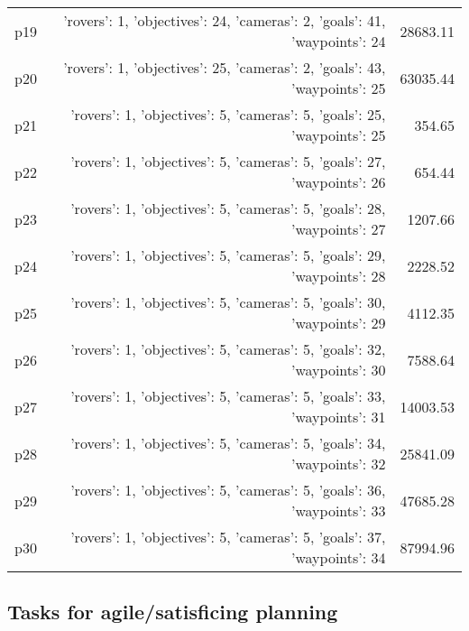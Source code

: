 \documentclass{article}
\begin{document}
\begin{center}
\begin{tabular}{@{}l|r|r@{}}
  p19&{'rovers': 1, 'objectives': 24, 'cameras': 2, 'goals': 41, 'waypoints': 24}&28683.11\\
  p20&{'rovers': 1, 'objectives': 25, 'cameras': 2, 'goals': 43, 'waypoints': 25}&63035.44\\
  p21&{'rovers': 1, 'objectives': 5, 'cameras': 5, 'goals': 25, 'waypoints': 25}&354.65\\
  p22&{'rovers': 1, 'objectives': 5, 'cameras': 5, 'goals': 27, 'waypoints': 26}&654.44\\
  p23&{'rovers': 1, 'objectives': 5, 'cameras': 5, 'goals': 28, 'waypoints': 27}&1207.66\\
  p24&{'rovers': 1, 'objectives': 5, 'cameras': 5, 'goals': 29, 'waypoints': 28}&2228.52\\
  p25&{'rovers': 1, 'objectives': 5, 'cameras': 5, 'goals': 30, 'waypoints': 29}&4112.35\\
  p26&{'rovers': 1, 'objectives': 5, 'cameras': 5, 'goals': 32, 'waypoints': 30}&7588.64\\
  p27&{'rovers': 1, 'objectives': 5, 'cameras': 5, 'goals': 33, 'waypoints': 31}&14003.53\\
  p28&{'rovers': 1, 'objectives': 5, 'cameras': 5, 'goals': 34, 'waypoints': 32}&25841.09\\
  p29&{'rovers': 1, 'objectives': 5, 'cameras': 5, 'goals': 36, 'waypoints': 33}&47685.28\\
  p30&{'rovers': 1, 'objectives': 5, 'cameras': 5, 'goals': 37, 'waypoints': 34}&87994.96
                            \end{tabular}
                            \end{center}
                    

                                \subsection*{Tasks for agile/satisficing planning}
                                
\end{document}
